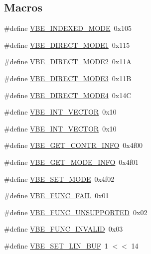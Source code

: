 \subsection*{Macros}
\begin{DoxyCompactItemize}
\item 
\#define \mbox{\hyperlink{group__vbe_ga9f6b7e24d061f6fc5287134b0a4fce05}{V\+B\+E\+\_\+\+I\+N\+D\+E\+X\+E\+D\+\_\+\+M\+O\+DE}}~0x105
\item 
\#define \mbox{\hyperlink{group__vbe_ga2ea8f5b656926407f09b3e54e3673a4c}{V\+B\+E\+\_\+\+D\+I\+R\+E\+C\+T\+\_\+\+M\+O\+D\+E1}}~0x115
\item 
\#define \mbox{\hyperlink{group__vbe_gad57ba244715311013c0a6bdd9e66e988}{V\+B\+E\+\_\+\+D\+I\+R\+E\+C\+T\+\_\+\+M\+O\+D\+E2}}~0x11A
\item 
\#define \mbox{\hyperlink{group__vbe_ga77b79fb73997de7a2199c55f4849093e}{V\+B\+E\+\_\+\+D\+I\+R\+E\+C\+T\+\_\+\+M\+O\+D\+E3}}~0x11B
\item 
\#define \mbox{\hyperlink{group__vbe_ga70f988d7bbb4a48c01db3ebe3f6196fa}{V\+B\+E\+\_\+\+D\+I\+R\+E\+C\+T\+\_\+\+M\+O\+D\+E4}}~0x14C
\item 
\#define \mbox{\hyperlink{group__vbe_ga8f25cfd241485c2579f6fb78b31247cb}{V\+B\+E\+\_\+\+I\+N\+T\+\_\+\+V\+E\+C\+T\+OR}}~0x10
\item 
\#define \mbox{\hyperlink{group__vbe_ga8f25cfd241485c2579f6fb78b31247cb}{V\+B\+E\+\_\+\+I\+N\+T\+\_\+\+V\+E\+C\+T\+OR}}~0x10
\item 
\#define \mbox{\hyperlink{group__vbe_ga012c5fede3b3d19dbd46f7dbab9e3ca7}{V\+B\+E\+\_\+\+G\+E\+T\+\_\+\+C\+O\+N\+T\+R\+\_\+\+I\+N\+FO}}~0x4f00
\item 
\#define \mbox{\hyperlink{group__vbe_ga4eb63bbc1741baadc619826cfaa0df57}{V\+B\+E\+\_\+\+G\+E\+T\+\_\+\+M\+O\+D\+E\+\_\+\+I\+N\+FO}}~0x4f01
\item 
\#define \mbox{\hyperlink{group__vbe_ga02477c4996ff058aee590b54f2146eb5}{V\+B\+E\+\_\+\+S\+E\+T\+\_\+\+M\+O\+DE}}~0x4f02
\item 
\#define \mbox{\hyperlink{group__vbe_gac0799fa6d233f113fb31ece5c47dc5c8}{V\+B\+E\+\_\+\+F\+U\+N\+C\+\_\+\+F\+A\+IL}}~0x01
\item 
\#define \mbox{\hyperlink{group__vbe_ga6c86d7c7e5ce065d6551806ebf11606f}{V\+B\+E\+\_\+\+F\+U\+N\+C\+\_\+\+U\+N\+S\+U\+P\+P\+O\+R\+T\+ED}}~0x02
\item 
\#define \mbox{\hyperlink{group__vbe_gabe6fbad36eaacc1996173a0897626572}{V\+B\+E\+\_\+\+F\+U\+N\+C\+\_\+\+I\+N\+V\+A\+L\+ID}}~0x03
\item 
\#define \mbox{\hyperlink{group__vbe_ga3c9c7d2da5d4fbb5813966c2f0cdfb11}{V\+B\+E\+\_\+\+S\+E\+T\+\_\+\+L\+I\+N\+\_\+\+B\+UF}}~1 $<$$<$ 14
\end{DoxyCompactItemize}

